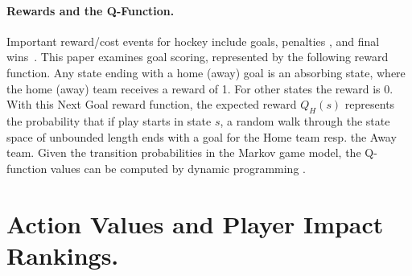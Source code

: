 \documentclass[runningheads,a4paper]{llncs}
\newcommand{\mstate}{s}
\newcommand{\reward}{\it{R}}
\newcommand{\action}{a}
\newcommand{\home}{H}
\newcommand{\away}{A}
\begin{document}
\paragraph{Rewards and the Q-Function.} Important reward/cost events for hockey include goals, penalties \cite{Routley2015a}, and final wins~\cite{Routley2015}.
This paper examines goal scoring, represented by the following reward function. Any state ending with a home (away) goal is an absorbing state, where the home (away) team receives a reward of 1. For other states the reward is 0. 
%
%
%
%
With this Next Goal reward function, the expected reward $Q_{\home}(\mstate)$
%
represents the probability that if play starts in state $\mstate$, a random walk through the state space of unbounded length ends with a goal for the Home team resp. the Away team. Given the transition probabilities in the Markov game model, the Q-function values can be computed by dynamic programming  \cite{Routley2015a}.


\section{Action Values and Player Impact Rankings.}
\label{subsec:action-values}
\end{document}
